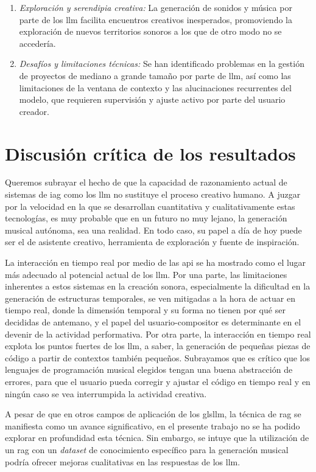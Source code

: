 \begin{enumerate}
    \item \textit{Exploración y serendipia creativa:} La generación de sonidos y música por parte de los \gls{llm} facilita encuentros creativos inesperados, promoviendo la exploración de nuevos territorios sonoros a los que de otro modo no se accedería.
    \item \textit{Desafíos y limitaciones técnicas:} Se han identificado problemas en la gestión de proyectos de mediano a grande tamaño por parte de \gls{llm}, así como las limitaciones de la ventana de contexto y las alucinaciones recurrentes del modelo, que requieren supervisión y ajuste activo por parte del usuario creador.

\end{enumerate}


\section{Discusión crítica de los resultados}

Queremos subrayar el hecho de que la capacidad de razonamiento actual de sistemas de \gls{iag} como los \gls{llm} no sustituye el proceso creativo humano. A juzgar por la velocidad en la que se desarrollan cuantitativa y cualitativamente estas tecnologías, es muy probable que en un futuro no muy lejano, la generación musical autónoma, sea una realidad. En todo caso, su papel a día de hoy puede ser el de asistente creativo, herramienta de exploración y fuente de inspiración.

La interacción en tiempo real por medio de las \gls{api} se ha mostrado como el lugar más adecuado al potencial actual de los \gls{llm}. Por una parte, las limitaciones inherentes a estos sistemas en la creación sonora, especialmente la dificultad en la generación de estructuras temporales, se ven mitigadas a la hora de actuar en tiempo real, donde la dimensión temporal y su forma no tienen por qué ser decididas de antemano, y el papel del usuario-compositor es determinante en el devenir de la actividad performativa. Por otra parte, la interacción en tiempo real explota los puntos fuertes de los \gls{llm}, a saber, la generación de pequeñas piezas de código a partir de contextos también pequeños. Subrayamos que es crítico que los lenguajes de programación musical elegidos tengan una buena abstracción de errores, para que el usuario pueda corregir y ajustar el código en tiempo real y en ningún caso se vea interrumpida la actividad creativa.

A pesar de que en otros campos de aplicación de los gls{llm}, la técnica de \gls{rag} se manifiesta como un avance significativo, en el presente trabajo no se ha podido explorar en profundidad esta técnica. Sin embargo, se intuye que la utilización de un \gls{rag} con un \emph{dataset} de conocimiento específico para la generación musical podría ofrecer mejoras cualitativas en las respuestas de los \gls{llm}.

